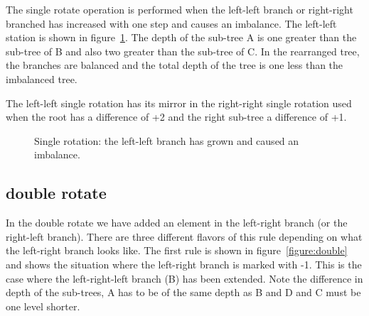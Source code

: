 \documentclass[a4paper,11pt]{article}
\begin{document}
The single rotate operation is performed when the left-left branch or
right-right branched has increased with one step and causes an
imbalance. The left-left station is shown in
figure~\ref{fig:single}. The depth of the sub-tree A is one greater
than the sub-tree of B and also two greater than the sub-tree of C. In
the rearranged tree, the branches are balanced and the total depth of
the tree is one less than the imbalanced tree.

The left-left single rotation has its mirror in the right-right
single rotation used when the root has a difference of +2 and the
right sub-tree a difference of +1.




\begin{figure}


\caption{Single rotation: the left-left branch has grown and caused an imbalance. \label{fig:single}}
\end{figure}

\subsection{double rotate}

In the double rotate we have added an element in the left-right branch
(or the right-left branch). There are three different flavors of this
rule depending on what the left-right branch looks like. The first
rule is shown in figure~\ref{figure:double} and shows the situation
where the left-right branch is marked with -1. This is the case where
the left-right-left branch (B) has been extended. Note the difference
in depth of the sub-trees, A has to be of the same depth as B and D
and C must be one level shorter.
\end{document}
